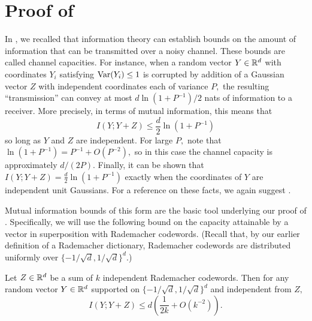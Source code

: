 \section{Proof of  \label{appendix:necessary}}

In , we recalled that information theory can establish bounds on the amount of information that can be transmitted over a noisy channel. These bounds are called channel capacities. For instance, when a random vector $Y \in \mathbb{R}^d$ with coordinates $Y_i$ satisfying $\operatorname{Var}(Y_i) \le 1$ is corrupted by addition of a Gaussian vector $Z$ with independent coordinates each of variance $P,$ the resulting ``transmission'' can convey at most $d \ln(1 + P^{-1})/2$ nats of information to a receiver. More precisely, in terms of mutual information, this means that
$$
I(Y; Y + Z) \le \frac d 2 \ln (1 + P^{-1})
$$
so long as $Y$ and $Z$ are independent. For large $P,$ note that $\ln(1 + P^{-1}) = P^{-1} + O(P^{-2}),$ so in this case the channel capacity is approximately $d/(2P).$ Finally, it can be shown that $I(Y; Y + Z) = \frac d 2 \ln(1 + P^{-1})$ exactly when the coordinates of $Y$ are independent unit Gaussians. For a reference on these facts, we again suggest \cite{cover_elements_2006}.

Mutual information bounds of this form are the basic tool underlying our proof of . Specifically, we will use the following bound on the capacity attainable by a vector in superposition with Rademacher codewords. (Recall that, by our earlier definition of a Rademacher dictionary, Rademacher codewords are distributed uniformly over $\{-1/\sqrt{d}, 1/\sqrt{d} \}^d.$)

\begin{proposition} \label{prop:mutual}
Let $Z \in \mathbb{R}^d$ be a sum of $k$ independent Rademacher codewords. Then for any random vector $Y \in \mathbb{R}^{d}$ supported on $\{-1/\sqrt{d}, 1/\sqrt{d}\}^d$ and independent from $Z,$
$$
I(Y; Y + Z) \le d \left( \frac 1 {2 k} + O(k^{-2}) \right).
$$
\end{proposition}

